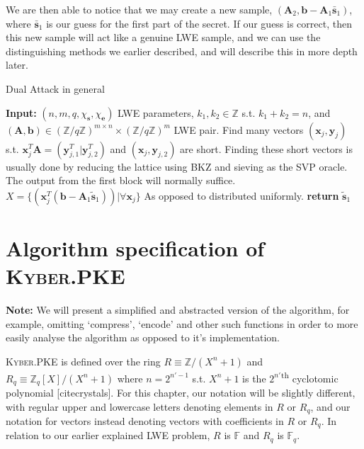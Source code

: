 \documentclass[a4paper, 10pt]{article}
\theoremstyle{definition}
\begin{document}
We are then able to notice that we may create a new sample, $(\mathbf{A}_2, \mathbf{b - A}_1 \bar{\mathbf{s}}_1)$, where $\bar{\mathbf{s}}_1$ is our guess for the first part of the secret. If our guess is correct, then this new sample will act like a genuine \ac{LWE} sample, and we can use the distinguishing methods we earlier described, and will describe this in more depth later.

\begin{algorithm}[H]
    \caption{Dual Attack in general}
    \begin{algorithmic}[1]
    \State \textbf{Input:} $(n,m,q,\chi _{\mathbf{s}}, \chi _{\mathbf{e}})$ LWE parameters, $k_1, k_2 \in \mathbb{Z}$ s.t. $k_1+k_2=n$, and $(\mathbf{A, b})\in (\mathbb{Z}/q\mathbb{Z})^{m \times n} \times (\mathbb{Z}/q\mathbb{Z})^m$ LWE pair.
    \State Find many vectors $(\mathbf{x}_j, \mathbf{y}_j)$ s.t. $\mathbf{x}_j^T\mathbf{A}=(\mathbf{y}_{j,1}^T|\mathbf{y}_{j,2}^T)$ and $(\mathbf{x}_j, \mathbf{y}_{j,2})$ are short. \Comment Finding these short vectors is usually done by reducing the lattice using \ac{BKZ} and sieving as the \ac{SVP} oracle. The output from the first block will normally suffice.
        \State $X = \{(\mathbf{x}_j^T(\mathbf{b}-\mathbf{A}_1\tilde{\mathbf{s}}_1))|\forall \mathbf{x}_j\}$
         \Comment As opposed to distributed uniformly.
            \State \textbf{return} $\tilde{\mathbf{s}}_1$
        \EndIf
    \EndFor
    \end{algorithmic}
\end{algorithm}

\newpage

\section{Algorithm specification of \textsc{Kyber}.PKE}

\textbf{Note:} We will present a simplified and abstracted version of the algorithm, for example, omitting `compress', `encode' and other such functions in order to more easily analyse the algorithm as opposed to it's implementation.

\textsc{Kyber}.\ac{PKE} is defined over the ring $R \equiv \mathbb{Z} /(X^n+1)$ and $R_q\equiv \mathbb{Z}_q[X]/(X^n+1)$ where $n=2^{n'-1}$ s.t. $X^{n}+1$ is the $2^{n'}$\textsuperscript{th} cyclotomic polynomial [citecrystals]. For this chapter, our notation will be slightly different, with regular upper and lowercase letters denoting elements in $R$ or $R_q$, and our notation for vectors instead denoting vectors with coefficients in $R$ or $R_q$. In relation to our earlier explained \ac{LWE} problem, $R$ is $\mathbb{F}$ and $R_q$ is $\mathbb{F}_q$. 
\end{document}
